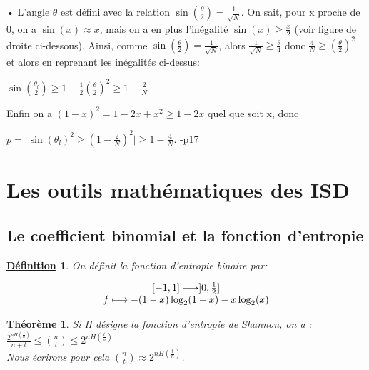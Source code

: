 \documentclass[12pt,openany]{report}
\newtheorem{theorem}{\underline{Théorème}}
\newtheorem{definition}{\underline{Définition}}
\begin{document}
\begin{itemize}
\begin{center}
\item[•] L'angle $\theta $ est défini avec la relation $\sin{(\frac{\theta}{2})}=\frac{1}{\sqrt{N}} $. On sait, pour x proche de 0, on a $ \sin{(x)}\approx x $, mais on a en plus l'inégalité $\sin{(x)}\geq \frac{x}{2} $ (voir figure de droite ci-dessous). Ainsi, comme $\sin{(\frac{\theta}{2})}=\frac{1}{\sqrt{N}} $, alors $\frac{1}{\sqrt{N}}\geq \frac{\theta}{4}  $ donc $\frac{4}{N} \geq {(\frac{\theta}{2})}^2 $ et alors en reprenant les inégalités ci-dessus:\\

\begin{center}
$ \sin{(\frac{\theta_l}{2})}\geq 1-\frac{1}{2}{(\frac{\theta}{2})}^2 \geq 1- \frac{2}{N} $
\end{center}
Enfin on a $ {(1-x)}^2=1-2x+x^2 \geq 1-2x$ quel que soit x, donc
\\
\begin{center}
$ p=\mid \sin{(\theta_l)}^2 \geq {\left(1-\frac{2}{N} \right)}^2  \mid \geq 1-\frac{4}{N} $. \cite{Arnaud}-p17
\end{center}



\end{center}



\end{itemize}


\section{Les outils mathématiques des ISD}
\subsection{Le coefficient binomial et la fonction d'entropie}
\begin{definition} On définit la fonction d'entropie binaire par:

\[
\left.
\begin{array}{c  c}
   [-1 , 1] \longrightarrow ] 0,\frac{1}{2}]\\
    f \longmapsto  -(1-x)\log_2(1-x)-x\log_2(x)

\end{array}
\right.
\]


\end{definition}
\begin{theorem} Si H désigne la fonction d’entropie de Shannon, on a :{\Large $\frac{2^{nH(\frac{t}{n})}}{n+t}\leq{{n}\choose{t}}\leq 2^{nH(\frac{t}{n})}$}\\
Nous écrirons pour cela {\Large $  {n \choose t }\approx 2^{nH(\frac{t}{n})}$}.\cite{Ghazal}

\end{theorem}
\end{document}
